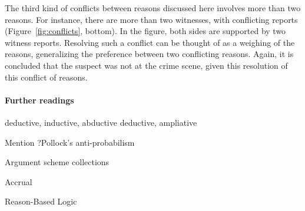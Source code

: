 \documentclass[10pt]{article}
\begin{document}
The third kind of conflicts between reasons discussed here involves more than two reasons. For instance, there are more than two witnesses, with conflicting reports (Figure~\ref{fig:conflicts}, bottom). In the figure, both sides are supported by two witness reports. Resolving such a conflict can be thought of as a weighing of the reasons, generalizing the preference between two conflicting reasons. Again, it is concluded that the suspect was not at the crime scene, given this resolution of this conflict of reasons.

\paragraph{Further readings} 
deductive, inductive, abductive
deductive, ampliative

Mention ?Pollock's anti-probabilism

Argument scheme collections

Accrual

Reason-Based Logic
\end{document}
